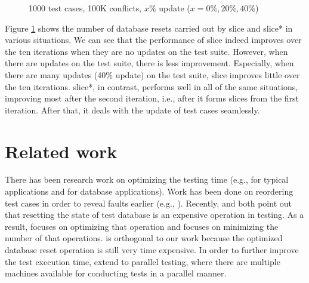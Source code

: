 \documentclass[authoryear,preprint,12pt]{elsarticle}
\begin{document}
\begin{figure}
\centering
{}
\caption{1000 test cases, 100K conflicts, $x\%$ update ($x = 0\%, 20\%, 40\%$)}
\label{updating}
\end{figure}
   
   Figure \ref{updating} shows the number of database resets carried out by {\sc slice} and {\sc slice*} in various situations.
   We can see that the performance of {\sc slice} indeed improves over the ten iterations when they are no updates on the test suite.
   However, when there are updates on the test suite, 
   there is less improvement.
   Especially, when there are many updates (40\% update) on the test suite, {\sc slice} improves little over the ten iterations.
   {\sc slice*}, in contrast, performs well in all of the same situations, improving most after the second iteration, i.e., after it forms slices from the first iteration.
   After that, it deals with the update of test cases seamlessly.
   

\section{Related work}
   \label{relatedwork}
    

There has been research work on optimizing the testing time
(e.g., \cite{tse97rothermel, harrold93,elbaum02} for typical applications 
and \cite{sac01daou,  icsm05willlmor, ICSE06} for database applications).
Work has been done on reordering test cases in order to reveal faults earlier (e.g., \cite{rothermel01, 1146240}).
Recently, \cite{chatterjee04} and \cite{cidr05} both point out that 
resetting the state of test database is an expensive operation in testing.
As a result, \cite{chatterjee04} focuses on optimizing that operation 
and \cite{cidr05} focuses on minimizing the number of that operations.
\cite{chatterjee04} is orthogonal to our work  because
the optimized database reset operation is still very time expensive.
In order to further improve the test execution time,
\cite{vldb, vldbj} extend \cite{cidr05} to parallel testing,
where there are multiple machines available for conducting tests in a parallel manner.
\end{document}
